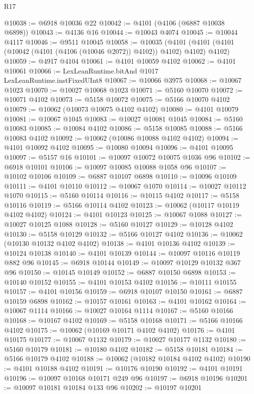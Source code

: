 \begin{lexlean}{R17}
\begin{coremodule}
@10038 := @6918 @10036 @22
@10042 := @4101 (@4106 (@6887 @10038 @6898))
@10043 := @4136 @16
@10044 := @10043 @4074
@10045 := @10044 @4117
@10046 := @9511 @10045
@10058 := @10035
    (@4101 (@4101 (@4101 (@10042 (@4101 (@4106 (@10046 @2072)) @4102)) @4102) @4102) @4102)
@10059 := @4917 @4104
@10061 := @4101 @10059 @4102
@10062 := @4101 @10061
@10066 := LexLeanRuntime.bitAnd @1017 LexLeanRuntime.instFixedUInt8
@10067 := @10066 @3975
@10068 := @10067 @1023
@10070 := @10027 @10068 @1023
@10071 := @5160 @10070
@10072 := @10071 @4102
@10073 := @5158 @10072
@10075 := @5166 @10070 @4102
@10079 := @10062 (@10073 @10075 @4102 @4102)
@10080 := @4101 @10079
@10081 := @10067 @1045
@10083 := @10027 @10081 @1045
@10084 := @5160 @10083
@10085 := @10084 @4102
@10086 := @5158 @10085
@10088 := @5166 @10083 @4102
@10092 := @10062 (@10086 @10088 @4102 @4102)
@10094 := @4101 @10092 @4102
@10095 := @10080 @10094
@10096 := @4101 @10095
@10097 := @5157 @16
@10101 := @10097 @10072 @10075 @1036 @96
@10102 := @6918 @10101
@10106 := @10097 @10085 @10088 @1058 @96
@10107 := @10102 @10106
@10109 := @6887 @10107 @6898
@10110 := @10096 @10109
@10111 := @4101 @10110
@10112 := @10067 @1070
@10114 := @10027 @10112 @1070
@10115 := @5160 @10114
@10116 := @10115 @4102
@10117 := @5158 @10116
@10119 := @5166 @10114 @4102
@10123 := @10062 (@10117 @10119 @4102 @4102)
@10124 := @4101 @10123
@10125 := @10067 @1088
@10127 := @10027 @10125 @1088
@10128 := @5160 @10127
@10129 := @10128 @4102
@10130 := @5158 @10129
@10132 := @5166 @10127 @4102
@10136 := @10062 (@10130 @10132 @4102 @4102)
@10138 := @4101 @10136 @4102
@10139 := @10124 @10138
@10140 := @4101 @10139
@10144 := @10097 @10116 @10119 @882 @96
@10145 := @6918 @10144
@10149 := @10097 @10129 @10132 @367 @96
@10150 := @10145 @10149
@10152 := @6887 @10150 @6898
@10153 := @10140 @10152
@10155 := @4101 @10153 @4102
@10156 := @10111 @10155
@10157 := @4101 @10156
@10159 := @6918 @10107 @10150
@10161 := @6887 @10159 @6898
@10162 := @10157 @10161
@10163 := @4101 @10162
@10164 := @10067 @1114
@10166 := @10027 @10164 @1114
@10167 := @5160 @10166
@10168 := @10167 @4102
@10169 := @5158 @10168
@10171 := @5166 @10166 @4102
@10175 := @10062 (@10169 @10171 @4102 @4102)
@10176 := @4101 @10175
@10177 := @10067 @1132
@10179 := @10027 @10177 @1132
@10180 := @5160 @10179
@10181 := @10180 @4102
@10182 := @5158 @10181
@10184 := @5166 @10179 @4102
@10188 := @10062 (@10182 @10184 @4102 @4102)
@10190 := @4101 @10188 @4102
@10191 := @10176 @10190
@10192 := @4101 @10191
@10196 := @10097 @10168 @10171 @249 @96
@10197 := @6918 @10196
@10201 := @10097 @10181 @10184 @133 @96
@10202 := @10197 @10201

\end{coremodule}
\end{lexlean}
